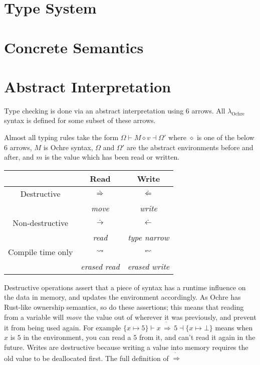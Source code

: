 \documentclass[12pt,twoside]{report}
\newcommand{\lochre}{$\lambda_\text{Ochre}$}
\begin{document}
\section{Type System}


\section{Concrete Semantics}


\section{Abstract Interpretation}
Type checking is done via an abstract interpretation using 6 arrows. All \lochre{} syntax is defined for some subset of these arrows.

Almost all typing rules take the form $\Omega \vdash M \diamond v \dashv \Omega'$ where $\diamond$ is one of the below 6 arrows, $M$ is Ochre syntax, $\Omega$ and $\Omega'$ are the abstract environments before and after, and $m$ is the value which has been read or written.

\begin{tabular}{c|c|c}
  & Read & Write \\
  \hline
  Destructive & $\,\dot{\Rightarrow}\,$ & $\,\dot{\Leftarrow}\,$ \\
  & \textit{move} & \textit{write}\\
  Non-destructive & $\,\dot{\rightarrow}\,$ & $\,\dot{\leftarrow}\,$ \\
  & \textit{read} & \textit{type narrow}\\
  Compile time only & $\,\rightsquigarrow\,$ &  $\erasedwritearrow$ \\
  & \textit{erased read} & \textit{erased write}\\
\end{tabular}

Destructive operations assert that a piece of syntax has a runtime influence on the data in memory, and updates the environment accordingly. As Ochre has Rust-like ownership semantics, so do these assertions; this means that reading from a variable will \textit{move} the value out of wherever it was previously, and prevent it from being used again. For example $\{x \mapsto 5\} \vdash x\,\dot{\Rightarrow}\,5 \dashv \{x \mapsto \bot\}$ means when $x$ is $5$ in the environment, you can read a $5$ from it, and can't read it again in the future. Writes are destructive because writing a value into memory requires the old value to be deallocated first. The full definition of $\dot{\Rightarrow}$
\end{document}
